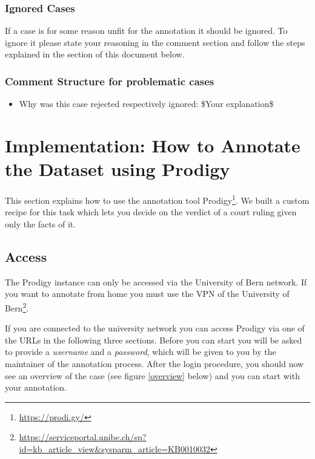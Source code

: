 \documentclass{article}
\begin{document}
\subsubsection{Ignored Cases}
If a case is for some reason unfit for the annotation it should be ignored. To ignore it please state your reasoning in the comment section and follow the steps explained in the  section of this document below. 

\subsubsection{Comment Structure for problematic cases}
\begin{mdframed}[frametitle={\$Annotators name\$}]
\begin{itemize}
	\item Why was this case rejected respectively ignored: \$Your explanation\$
\end{itemize}	
\end{mdframed}

\section{Implementation: How to Annotate the Dataset using Prodigy}
This section explains how to use the annotation tool Prodigy\footnote{\href{https://prodi.gy/}{https://prodi.gy/}}. We built a custom recipe for this task which lets you decide on the verdict of a court ruling given only the facts of it.

\subsection{Access}
The Prodigy instance can only be accessed via the University of Bern network. If you want to annotate from home you must use the VPN of the University of Bern\footnote{\href{https://serviceportal.unibe.ch/sp?id=kb_article_view&sysparm_article=KB0010032}{https://serviceportal.unibe.ch/sp?id=kb_article_view&sysparm_article=KB0010032}}.

If you are connected to the university network you can access Prodigy via one of the URLs in the following three sections. Before you can start you will be asked to provide a \emph{username} and a \emph{password}, which will be given to you by the maintainer of the annotation process. After the login procedure, you should now see an overview  of the case (see figure \ref{overview} below) and you can start with your annotation.
\end{document}
